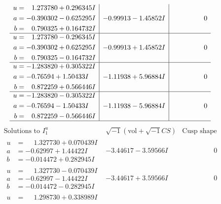 \documentclass[1p]{elsarticle_modified}
\theoremstyle{definition}
\newcommand{\I}{\sqrt{-1}}
\begin{document}
$$\begin{array}{c|c|c}
\begin{aligned}
u &= \phantom{-}1.273780 + 0.296345 I \\
a &= -0.390302 - 0.625295 I \\
b &= \phantom{-}0.790325 + 0.164732 I\end{aligned}
 & -0.99913 - 1.45852 I & \phantom{-0.000000 } 0 \\ \hline\begin{aligned}
u &= \phantom{-}1.273780 - 0.296345 I \\
a &= -0.390302 + 0.625295 I \\
b &= \phantom{-}0.790325 - 0.164732 I\end{aligned}
 & -0.99913 + 1.45852 I & \phantom{-0.000000 } 0 \\ \hline\begin{aligned}
u &= -1.283820 + 0.305322 I \\
a &= -0.76594 + 1.50433 I \\
b &= \phantom{-}0.872259 + 0.566446 I\end{aligned}
 & -1.11938 + 5.96884 I & \phantom{-0.000000 } 0 \\ \hline\begin{aligned}
u &= -1.283820 - 0.305322 I \\
a &= -0.76594 - 1.50433 I \\
b &= \phantom{-}0.872259 - 0.566446 I\end{aligned}
 & -1.11938 - 5.96884 I & \phantom{-0.000000 } 0\\
 \hline 
 \end{array}$$\newpage$$\begin{array}{c|c|c}  
\text{Solutions to }I^u_{1}& \I (\text{vol} + \sqrt{-1}CS) & \text{Cusp shape}\\
 \hline 
\begin{aligned}
u &= \phantom{-}1.327730 + 0.070439 I \\
a &= -0.62997 + 1.44422 I \\
b &= -0.014472 + 0.282945 I\end{aligned}
 & -3.44617 - 3.59566 I & \phantom{-0.000000 } 0 \\ \hline\begin{aligned}
u &= \phantom{-}1.327730 - 0.070439 I \\
a &= -0.62997 - 1.44422 I \\
b &= -0.014472 - 0.282945 I\end{aligned}
 & -3.44617 + 3.59566 I & \phantom{-0.000000 } 0 \\ \hline\begin{aligned}
u &= \phantom{-}1.298730 + 0.338989 I \\

\end{aligned}
\end{array}$$
\end{document}

